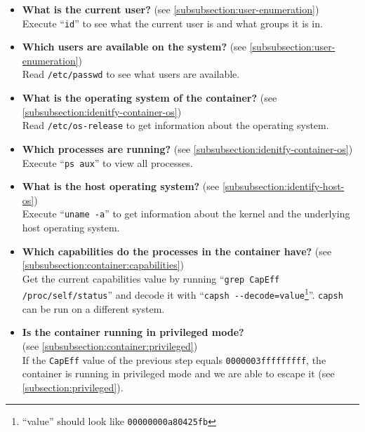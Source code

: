 \begin{itemize}
    \item \textbf{What is the current user?} (see \autoref{subsubsection:user-enumeration})\\
    Execute ``\lstinline{id}'' to see what the current user is and what groups it is in.

    \item \textbf{Which users are available on the system?} (see \autoref{subsubsection:user-enumeration})\\
    Read \lstinline{/etc/passwd} to see what users are available.

    \item \textbf{What is the operating system of the container?} (see \autoref{subsubsection:idenitfy-container-os})\\
    Read \lstinline{/etc/os-release} to get information about the operating system.

    \item \textbf{Which processes are running?} (see \autoref{subsubsection:idenitfy-container-os})\\
    Execute ``\lstinline{ps aux}'' to view all processes.

    \item \textbf{What is the host operating system?} (see \autoref{subsubsection:identify-host-os})\\
    Execute ``\lstinline{uname -a}'' to get information about the kernel and the underlying host operating system.

    \item \textbf{Which capabilities do the processes in the container have?} (see \autoref{subsubsection:container:capabilities})\\
    Get the current capabilities value by running ``\lstinline{grep CapEff /proc/self/status}'' and decode it with ``\lstinline{capsh --decode=value}\footnote{``value'' should look like \lstinline{00000000a80425fb}}''. \lstinline{capsh} can be run on a different system.

    \item \textbf{Is the container running in privileged mode?}
    \\(see \autoref{subsubsection:container:privileged})\\
    If the \lstinline{CapEff} value of the previous step equals \lstinline{0000003fffffffff}, the container is running in privileged mode and we are able to escape it (see \autoref{subsection:privileged}).


\end{itemize}
